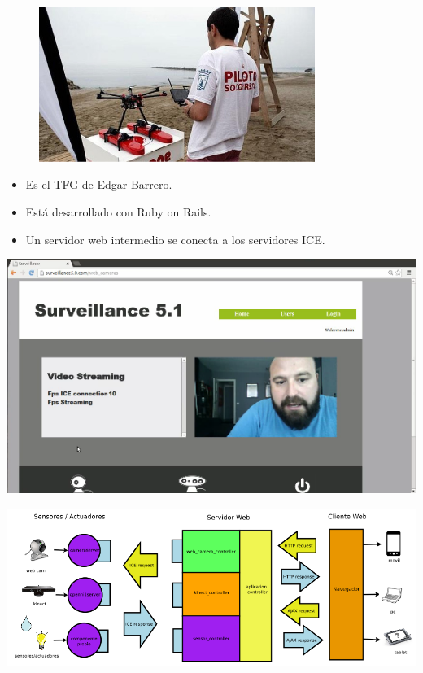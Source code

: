 \documentclass[notes,slidesec,a4]{seminar}
\begin{document}
\begin{hslide}
\begin{minipage}[t]{0.5\textwidth}
\begin{center}
\begin{figure}
\includegraphics[width=0.8\textwidth]{img/socorrista}
\end{figure}
\end{center}
\end{minipage}
\end{hslide}



\begin{hslide}
\begin{itemize}
\item Es el TFG de Edgar Barrero.
\item Está desarrollado con Ruby on Rails.
\item Un servidor web intermedio se conecta a los servidores ICE.
\end{itemize}
\begin{minipage}[t]{0.3\textwidth}
\includegraphics[width=\textwidth]{img/surveillance5}
\end{minipage}
\begin{minipage}[t]{0.7\textwidth}
\includegraphics[width=\textwidth]{img/esquema_s5}
\end{minipage}
\end{hslide}
\end{document}

